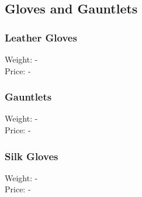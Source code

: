 
\subsection{Gloves and Gauntlets}

\subsubsection{Leather Gloves}
Weight: -\\
Price: -\\

\subsubsection{Gauntlets}
Weight: -\\
Price: -\\

\subsubsection{Silk Gloves}
Weight: -\\
Price: -\\